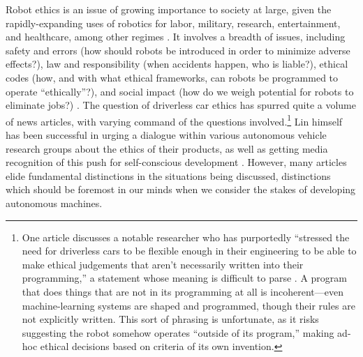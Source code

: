 



Robot ethics is an issue of growing importance to society at
large, given the rapidly-expanding uses of robotics for labor, military,
research, entertainment, and healthcare, among other regimes \cite[p.
  5-6]{patrickLin}. It involves a breadth of issues,
including safety and errors (how should 
robots be introduced in order to minimize adverse effects?), law and
responsibility (when accidents happen, who is liable?), ethical codes
(how, and with what ethical frameworks, can robots be programmed to
operate ``ethically''?), and social impact
(how do we weigh potential for robots to eliminate
jobs?) \cite{robotEthics}. The question of
driverless car ethics has spurred quite a volume of news articles,
with varying command of the questions
involved.\footnote{One article discusses a notable
  researcher who has purportedly ``stressed the need for driverless
  cars to be flexible enough in their 
engineering to be able to make ethical judgements that aren't
necessarily written into their programming,'' a statement whose
meaning is difficult to parse \cite{jessicaDavies}. A
program that does things that are not in its programming at all is
incoherent---even machine-learning systems are shaped and programmed,
though their rules are not explicitly written. This sort of phrasing is unfortunate, as it 
risks suggesting the robot somehow operates ``outside of its
program,'' making ad-hoc ethical decisions based on criteria of its
own invention.} Lin himself has been successful in urging a dialogue
within various autonomous vehicle research groups about the ethics of
their products, as well as getting media recognition of this push for
self-conscious development \cite{timeEthics}. However, many articles
elide fundamental distinctions in the situations being discussed,
distinctions which should be foremost in our minds when we consider
the stakes of developing autonomous machines.

